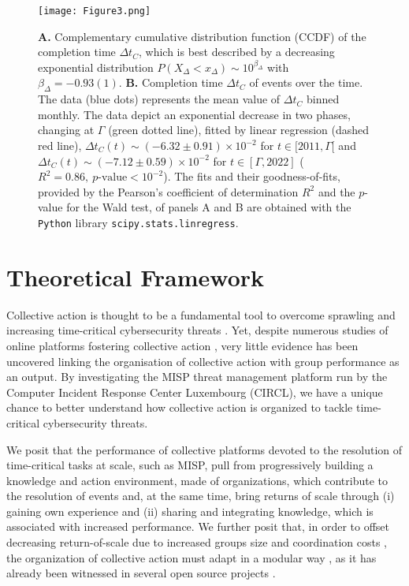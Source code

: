 \documentclass[unnumsec,webpdf,contemporary,large]{oup-authoring-template}%
\theoremstyle{thmstyleone}%
\theoremstyle{thmstyletwo}%
\theoremstyle{thmstylethree}%
\begin{document}
\begin{figure}[ht]
\centering
\texttt{[image: Figure3.png]}
\caption{{\bf A.} Complementary cumulative distribution function (CCDF) of the completion time $\Delta t_C$, which is best described by a decreasing exponential distribution $P(X_{\Delta} < x_{\Delta}) \sim 10^{\beta_{\Delta}}$ with $\beta_{\Delta} = -0.93(1)$. {\bf B.} Completion time $\Delta t_C$ of events over the time. The data (blue dots) represents the mean value of $\Delta t_C$ binned monthly. The data depict an exponential decrease in two phases, changing at $\Gamma$ (green dotted line), fitted by linear regression (dashed red line), $\Delta t_C(t) \sim (-6.32 \pm 0.91) \times 10^{-2}$ for $t \in [2011,\Gamma[$ and $\Delta t_C(t) \sim (-7.12 \pm 0.59) \times 10^{-2}$ for $t \in [\Gamma,2022]$ ($R^2 = 0.86,~p\textrm{-value} < 10^{-2}$). The fits and their goodness-of-fits, provided by the Pearson's coefficient of determination $R^2$ and the $p$-value for the Wald test, of panels A and B are obtained with the \texttt{Python} library \texttt{scipy.stats.linregress}.}
\label{fig:Deltat}
\end{figure} 

\section{Theoretical Framework}
\label{sec:theory}
Collective action is thought to be a fundamental tool to overcome sprawling and increasing time-critical cybersecurity threats \cite{mermoud_three_2019,bouwman_governance_2018,wagner_cyber_2019}. Yet, despite numerous studies of online platforms fostering collective action \cite{bouwman_helping_2022,mccoll_performance_2014}, very little evidence has been uncovered linking the organisation of collective action with group performance as an output. By investigating the MISP threat management platform run by the Computer Incident Response Center Luxembourg (CIRCL), we have a unique chance to better understand how collective action is organized to tackle time-critical cybersecurity threats.

We posit that the  performance of collective platforms devoted to the resolution of time-critical tasks at scale, such as MISP, pull from progressively building a knowledge and action environment, made of organizations, which contribute to the resolution of events and, at the same time, bring returns of scale through (i) gaining own experience and (ii) sharing and integrating knowledge, which is associated with increased performance. We further posit that, in order to offset decreasing return-of-scale due to increased groups size and coordination costs \cite{scholtes_aristotle_2016}, the organization of collective action must adapt in a modular way \cite{baldwin_architecture_2006}, as it has already been witnessed in several open source projects \cite{narduzzo_role_2005,langlois_hackers_2008}.
\end{document}

